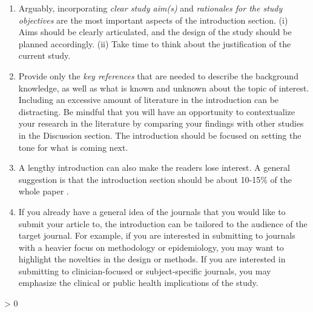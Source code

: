\documentclass[
]{book}
\providecommand{\tightlist}{%
  \setlength{\itemsep}{0pt}\setlength{\parskip}{0pt}}
\newlength{\cslhangindent}
\newenvironment{CSLReferences}[2] %
 {%
  \setlength{\parindent}{0pt}
  \ifodd #1 \everypar{\setlength{\hangindent}{\cslhangindent}}\ignorespaces\fi
  \ifnum #2 > 0
  \setlength{\parskip}{#2\baselineskip}
  \fi
 }%
 {}
\begin{document}
\begin{enumerate}
\def\labelenumi{\arabic{enumi}.}
\tightlist
\item
  Arguably, incorporating \emph{clear study aim(s)} and \emph{rationales for the study objectives} are the most important aspects of the introduction section. (i) Aims should be clearly articulated, and the design of the study should be planned accordingly. (ii) Take time to think about the justification of the current study.
\item
  Provide only the \emph{key references} that are needed to describe the background knowledge, as well as what is known and unknown about the topic of interest. Including an excessive amount of literature in the introduction can be distracting. Be mindful that you will have an opportunity to contextualize your research in the literature by comparing your findings with other studies in the Discussion section. The introduction should be focused on setting the tone for what is coming next.
\item
  A lengthy introduction can also make the readers lose interest. A general suggestion is that the introduction section should be about 10-15\% of the whole paper \citep{cals2013effective}.
\item
  If you already have a general idea of the journals that you would like to submit your article to, the introduction can be tailored to the audience of the target journal. For example, if you are interested in submitting to journals with a heavier focus on methodology or epidemiology, you may want to highlight the novelties in the design or methods. If you are interested in submitting to clinician-focused or subject-specific journals, you may emphasize the clinical or public health implications of the study.
\end{enumerate}

\hypertarget{refs}{}
\begin{CSLReferences}{0}{0}
\end{CSLReferences}

  
\end{document}
